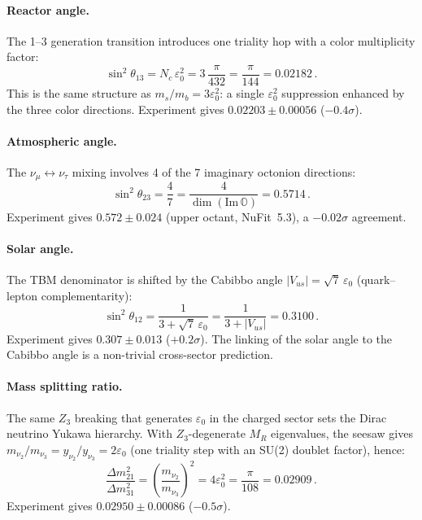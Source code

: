 \documentclass[12pt,a4paper]{article}
\theoremstyle{definition}
\theoremstyle{remark}
\newcommand{\Oct}{\mathbb{O}}
\newcommand{\MR}{M_R}
\begin{document}
\paragraph{Reactor angle.} The 1--3 generation transition introduces one 
triality hop with a color multiplicity factor:
\begin{equation}
\sin^2\theta_{13} = N_c\,\varepsilon_0^2 = 3\,\frac{\pi}{432} 
= \frac{\pi}{144} = 0.02182\,.
\end{equation}
This is the same structure as $m_s/m_b = 3\varepsilon_0^2$: a single 
$\varepsilon_0^2$ suppression enhanced by the three color directions.
Experiment gives $0.02203\pm 0.00056$ ($-0.4\sigma$).

\paragraph{Atmospheric angle.} The $\nu_\mu\leftrightarrow\nu_\tau$ mixing 
involves 4 of the 7 imaginary octonion directions:
\begin{equation}
\sin^2\theta_{23} = \frac{4}{7} = \frac{4}{\dim(\text{Im}\,\Oct)} = 0.5714\,.
\end{equation}
Experiment gives $0.572\pm 0.024$ (upper octant, NuFit~5.3), 
a $-0.02\sigma$ agreement.

\paragraph{Solar angle.} The TBM denominator is shifted by the Cabibbo angle 
$|V_{us}| = \sqrt{7}\,\varepsilon_0$ (quark--lepton complementarity):
\begin{equation}
\sin^2\theta_{12} = \frac{1}{3 + \sqrt{7}\,\varepsilon_0} 
= \frac{1}{3 + |V_{us}|} = 0.3100\,.
\end{equation}
Experiment gives $0.307\pm 0.013$ ($+0.2\sigma$). The linking of the solar 
angle to the Cabibbo angle is a non-trivial cross-sector prediction.

\paragraph{Mass splitting ratio.} The same $Z_3$ breaking that generates 
$\varepsilon_0$ in the charged sector sets the Dirac neutrino Yukawa 
hierarchy. With $Z_3$-degenerate $\MR$ eigenvalues, the seesaw gives 
$m_{\nu_2}/m_{\nu_3} = y_{\nu_2}/y_{\nu_3} = 2\varepsilon_0$ 
(one triality step with an SU(2) doublet factor), hence:
\begin{equation}
\frac{\Delta m^2_{21}}{\Delta m^2_{31}} = \left(\frac{m_{\nu_2}}{m_{\nu_3}}\right)^2 
= 4\varepsilon_0^2 = \frac{\pi}{108} = 0.02909\,.
\end{equation}
Experiment gives $0.02950\pm 0.00086$ ($-0.5\sigma$).
\end{document}
